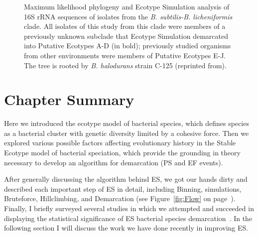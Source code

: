 \begin{figure}[h!]
\caption[Example ES analysis of 16s rRNA sequences of isolates.]{Maximum likelihood phylogeny and Ecotype Simulation analysis of 16S rRNA sequences of isolates from the \emph{B. subtilis-B. licheniformis} clade. All isolates of this study from this clade were members of a previously unknown subclade that Ecotype Simulation demarcated into Putative Ecotypes A-D (in bold); previously studied organisms from other environments were members of Putative Ecotypes E-J. The tree is rooted by \emph{B. halodurans} strain C-125 (reprinted from\protect\cite{kim2012diversity}).}
\label{fig:DeathES}
\end{figure}

\section{Chapter Summary}
Here we introduced the ecotype model of bacterial species, which defines species as a bacterial cluster with genetic diversity limited by a cohesive force.
Then we explored various possible factors affecting evolutionary history in the Stable Ecotype model of bacterial speciation, which provide the grounding in theory necessary to develop an algorithm for demarcation (PS and EF events).

After generally discussing the algorithm behind ES, we got our hands dirty and described each important step of ES in detail, including Binning, simulations, Bruteforce, Hillclimbing, and Demarcation (see Figure~\ref{fig:Flow} on page~\pageref{fig:Flow}).
Finally, I briefly surveyed several studies in which we attempted and succeeded in displaying the statistical significance of ES bacterial species demarcation~\cite{pyroEric, connor2010ecology, kim2012diversity}.
In the following section I will discuss the work we have done recently in improving ES.




